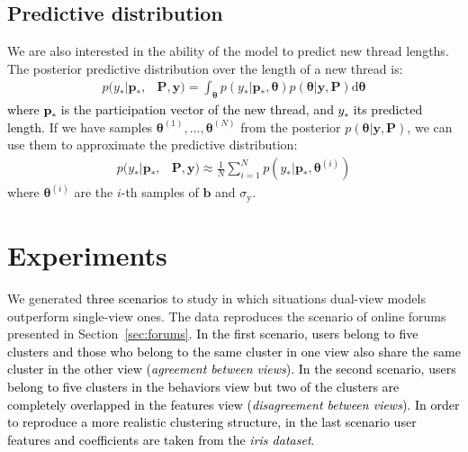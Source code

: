\documentclass[smallextended]{svjour3}          %
\newcommand\alberto[1]{\textcolor{black}{#1}}
\begin{document}
\subsection{Predictive distribution}
We are also interested in the ability of the model to predict new thread lengths. The posterior predictive distribution over the length of a new thread is:
\begin{align}
p(y_* | \mathbf{p_*}, & \mathbf{P}, \mathbf{y}) =
\int_{\boldsymbol{\theta}} 
p(y_* | \mathbf{p_*}, \boldsymbol{\theta})
p(\boldsymbol{\theta} | \mathbf{y}, \mathbf{P}) \text{d}\boldsymbol{\theta}
\end{align}
\alberto{where $\mathbf{p_*}$ is the participation vector of the new thread, and $y_*$ its predicted length.}
If we have samples $\boldsymbol{\theta}^{(1)},...,\boldsymbol{\theta}^{(N)}$ from the posterior $p(\boldsymbol{\theta}| \mathbf{y}, \mathbf{P})$, we can use them to approximate the predictive distribution:
\begin{align}
p(y_* | \mathbf{p_*}, & \mathbf{P}, \mathbf{y}) 
\approx
\frac{1}{N}
\sum_{i=1}^N
p(y_* | \mathbf{p_*}, \boldsymbol{\theta}^{(i)})
\label{eq:predictive_posterior_approx}
\end{align}
where $\boldsymbol{\theta}^{(i)}$ are the $i$-th samples of $\mathbf{b}$ and $\sigma_\text{y}$.


\section{Experiments}\label{sec:experiments}
We generated \alberto{three scenarios} to study in which situations dual-view models outperform single-view ones. The data reproduces the scenario of online forums presented in Section~\ref{sec:forums}. \alberto{In the first scenario, users belong to five clusters and those who belong to the same cluster in one view also share the same cluster in the other view (\textit{agreement between views}). In the second scenario, users belong to five clusters in the behaviors view but two of the clusters are completely overlapped in the features view (\textit{disagreement between views}). In order to reproduce a more realistic clustering structure, in the last scenario user features and coefficients are taken from the \textit{iris dataset}}.

\end{document}
